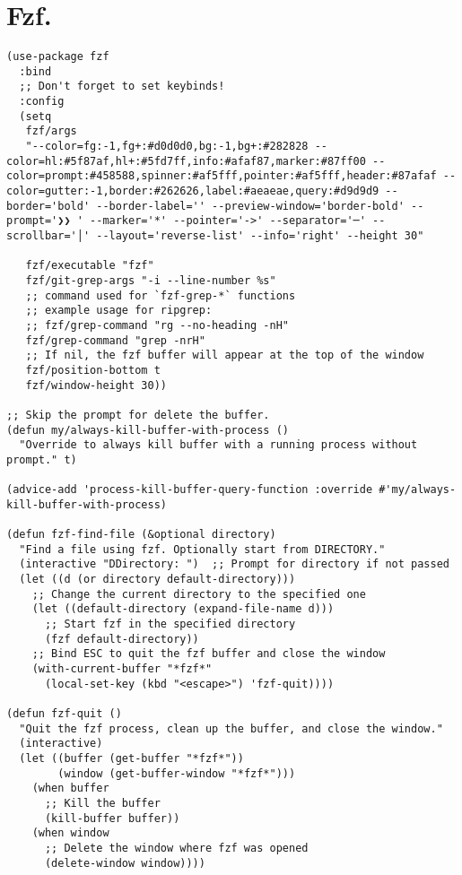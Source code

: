\documentclass[11pt]{article}
\begin{document}
\section{Fzf.}
\label{sec:orgc958372}
\begin{verbatim}
(use-package fzf
  :bind
  ;; Don't forget to set keybinds!
  :config
  (setq
   fzf/args
   "--color=fg:-1,fg+:#d0d0d0,bg:-1,bg+:#282828 --color=hl:#5f87af,hl+:#5fd7ff,info:#afaf87,marker:#87ff00 --color=prompt:#458588,spinner:#af5fff,pointer:#af5fff,header:#87afaf --color=gutter:-1,border:#262626,label:#aeaeae,query:#d9d9d9 --border='bold' --border-label='' --preview-window='border-bold' --prompt='❯❯ ' --marker='*' --pointer='->' --separator='─' --scrollbar='│' --layout='reverse-list' --info='right' --height 30"

   fzf/executable "fzf"
   fzf/git-grep-args "-i --line-number %s"
   ;; command used for `fzf-grep-*` functions
   ;; example usage for ripgrep:
   ;; fzf/grep-command "rg --no-heading -nH"
   fzf/grep-command "grep -nrH"
   ;; If nil, the fzf buffer will appear at the top of the window
   fzf/position-bottom t
   fzf/window-height 30))

;; Skip the prompt for delete the buffer.
(defun my/always-kill-buffer-with-process ()
  "Override to always kill buffer with a running process without prompt." t)

(advice-add 'process-kill-buffer-query-function :override #'my/always-kill-buffer-with-process)

(defun fzf-find-file (&optional directory)
  "Find a file using fzf. Optionally start from DIRECTORY."
  (interactive "DDirectory: ")  ;; Prompt for directory if not passed
  (let ((d (or directory default-directory)))
    ;; Change the current directory to the specified one
    (let ((default-directory (expand-file-name d)))
      ;; Start fzf in the specified directory
      (fzf default-directory))
    ;; Bind ESC to quit the fzf buffer and close the window
    (with-current-buffer "*fzf*"
      (local-set-key (kbd "<escape>") 'fzf-quit))))

(defun fzf-quit ()
  "Quit the fzf process, clean up the buffer, and close the window."
  (interactive)
  (let ((buffer (get-buffer "*fzf*"))
        (window (get-buffer-window "*fzf*")))
    (when buffer
      ;; Kill the buffer
      (kill-buffer buffer))
    (when window
      ;; Delete the window where fzf was opened
      (delete-window window))))
\end{verbatim}
\end{document}
